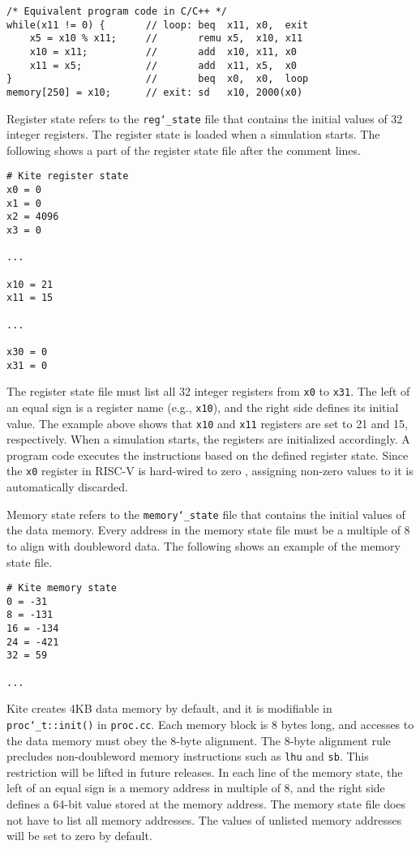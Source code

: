 \documentclass[10pt]{article}
\begin{document}
\begin{Verbatim}[frame=single,fontsize=\small]
/* Equivalent program code in C/C++ */
while(x11 != 0) {       // loop: beq  x11, x0,  exit
    x5 = x10 % x11;     //       remu x5,  x10, x11
    x10 = x11;          //       add  x10, x11, x0
    x11 = x5;           //       add  x11, x5,  x0
}                       //       beq  x0,  x0,  loop
memory[250] = x10;      // exit: sd   x10, 2000(x0)
\end{Verbatim}

Register state refers to the {\tt\small reg\char`_state} file that contains the initial values of 32 integer registers.
The register state is loaded when a simulation starts.
The following shows a part of the register state file after the comment lines.

\begin{Verbatim}[frame=single,fontsize=\small]
# Kite register state
x0 = 0
x1 = 0
x2 = 4096
x3 = 0

...

x10 = 21
x11 = 15

...

x30 = 0
x31 = 0
\end{Verbatim}

The register state file must list all 32 integer registers from {\tt\small x0} to {\tt\small x31}.
The left of an equal sign is a register name (e.g., {\tt\small x10}), and the right side defines its initial value.
The example above shows that {\tt\small x10} and {\tt\small x11} registers are set to 21 and 15, respectively.
When a simulation starts, the registers are initialized accordingly.
A program code executes the instructions based on the defined register state.
Since the {\tt\small x0} register in RISC-V is hard-wired to zero \cite{patterson_morgan2017}, assigning non-zero values to it is automatically discarded.

Memory state refers to the {\tt\small memory\char`_state} file that contains the initial values of the data memory.
Every address in the memory state file must be a multiple of 8 to align with doubleword data.
The following shows an example of the memory state file.

\begin{Verbatim}[frame=single,fontsize=\small]
# Kite memory state
0 = -31
8 = -131
16 = -134
24 = -421
32 = 59

...

\end{Verbatim}

Kite creates 4KB data memory by default, and it is modifiable in {\tt\small proc\char`_t::init()} in {\tt\small proc.cc}.
Each memory block is 8 bytes long, and accesses to the data memory must obey the 8-byte alignment.
The 8-byte alignment rule precludes non-doubleword memory instructions such as {\tt\small lhu} and {\tt\small sb}.
This restriction will be lifted in future releases.
In each line of the memory state, the left of an equal sign is a memory address in multiple of 8, and the right side defines a 64-bit value stored at the memory address.
The memory state file does not have to list all memory addresses.
The values of unlisted memory addresses will be set to zero by default.
\end{document}
